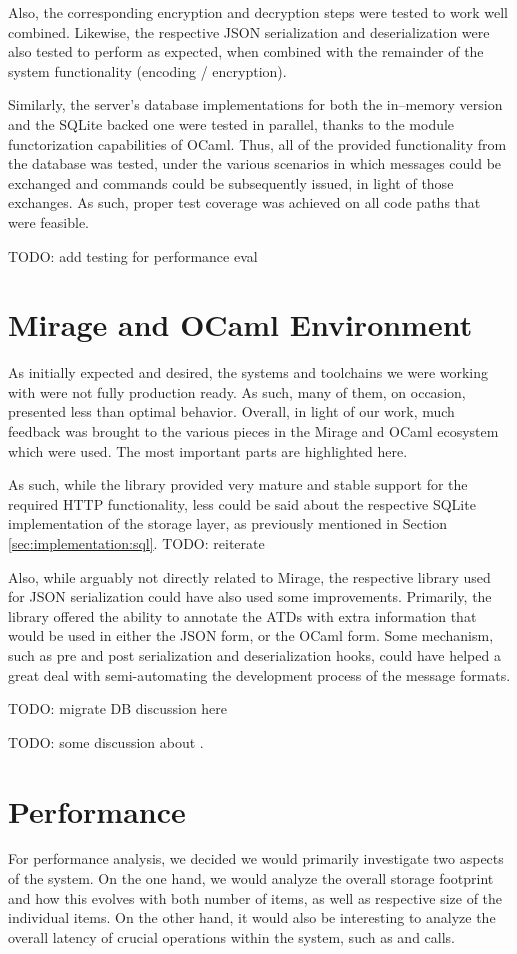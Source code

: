 Also, the corresponding encryption and decryption steps were tested to work well combined.
Likewise, the respective JSON serialization and deserialization were also tested to perform as expected, when combined with the remainder of the system functionality (encoding / encryption).

Similarly, the server's database implementations for both the in--memory version and the SQLite backed one were tested in parallel, thanks to the module functorization capabilities of OCaml.
Thus, all of the provided functionality from the database was tested, under the various scenarios in which messages could be exchanged and commands could be subsequently issued, in light of those exchanges.
As such, proper test coverage was achieved on all code paths that were feasible.

TODO: add testing for performance eval

\section{Mirage and OCaml Environment}
As initially expected and desired, the systems and toolchains we were working with were not fully production ready.
As such, many of them, on occasion, presented less than optimal behavior.
Overall, in light of our work, much feedback was brought to the various pieces in the Mirage and OCaml ecosystem which were used.
The most important parts are highlighted here.

As such, while the  library provided very mature and stable support for the required HTTP functionality, less could be said about the respective SQLite implementation of the storage layer, as previously mentioned in Section \ref{sec:implementation:sql}. TODO: reiterate

Also, while arguably not directly related to Mirage, the respective library used for JSON serialization could have also used some improvements.
Primarily, the library offered the ability to annotate the ATDs with extra information that would be used in either the JSON form, or the OCaml form.
Some mechanism, such as pre and post serialization and deserialization hooks, could have helped a great deal with semi-automating the development process of the message formats.

TODO: migrate DB discussion here

TODO: some discussion about .

\section{Performance}
For performance analysis, we decided we would primarily investigate two aspects of the system.
On the one hand, we would analyze the overall storage footprint and how this evolves with both number of items, as well as respective size of the individual items.
On the other hand, it would also be interesting to analyze the overall latency of crucial operations within the system, such as  and  calls.

